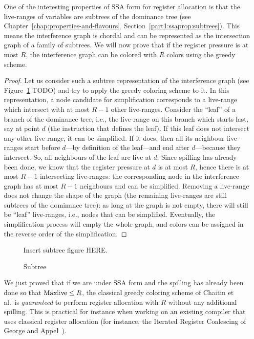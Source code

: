 {One of the interesting properties of SSA form for register allocation is that the live-ranges of variables are subtrees of the dominance tree (see Chapter~\ref{chap:properties-and-flavours}, Section~\ref{part1:ssaprop:subtrees}).
This means the interference graph is chordal and can be represented as the intersection graph of a family of subtrees.
We will now prove that if the register pressure is at most $R$, the interference graph can be colored with $R$ colors using the greedy scheme.

\begin{proof}
  Let us consider such a subtree representation of the interference graph (see Figure~\ref{fig:regalloc:subtree} TODO) and try to apply the greedy coloring scheme to it.
  In this representation, a node candidate for simplification corresponds to a live-range which intersect with at most $R-1$ other live-ranges.
  Consider the ``leaf'' of a branch of the dominance tree, i.e., the live-range on this branch which starts last, say at point $d$ (the instruction that defines the leaf).
  If this leaf does not intersect any other live-range, it can be simplified.
  If it does, then all its neighbour live-ranges start before $d$---by definition of the leaf---and end after $d$---because they intersect.
  So, all neighbours of the leaf are live at $d$;
  Since spilling has already been done, we know that the register pressure at $d$ is at most $R$, hence there is at most $R-1$ intersecting live-ranges:
  the corresponding node in the interference graph has at most $R-1$ neighbours and can be simplified.
  Removing a live-range does not change the shape of the graph (the remaining live-ranges are still subtrees of the dominance tree):
  as long at the graph is not empty, there will still be ``leaf'' live-ranges, i.e., nodes that can be simplified.
  Eventually, the simplification process will empty the whole graph, and colors can be assigned in the reverse order of the simplification.
\end{proof}

\begin{figure}
  Insert subtree figure HERE.
  \caption{Subtree}
  \label{fig:regalloc:subtree}
\end{figure}

We just proved that if we are under SSA form and the spilling has already been done so that $\mathrm{Maxlive} \leq R$, the classical greedy coloring scheme of Chaitin et al.\ is \emph{guaranteed} to perform register allocation with $R$ without any additional spilling.
This is practical for instance when working on an existing compiler that uses classical register allocation (for instance, the Iterated Register Coalescing of George and Appel~\cite{george:96:iterated}).


}
